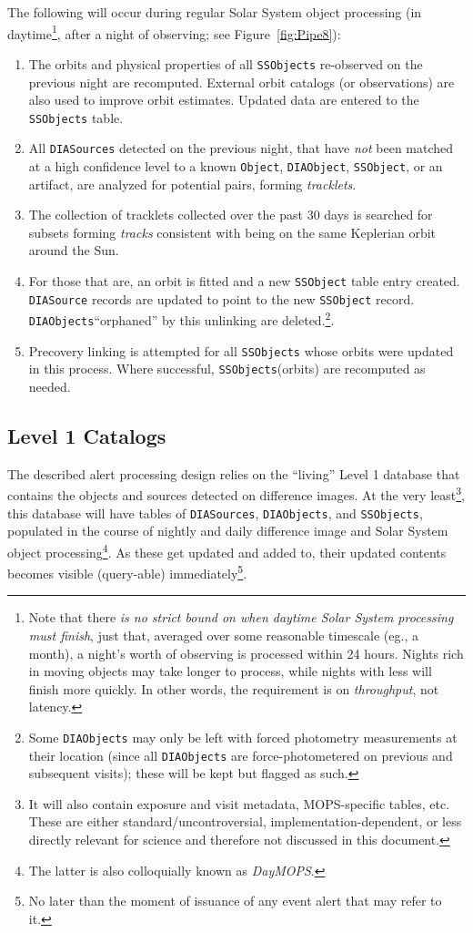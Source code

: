 \documentclass[12pt]{article}
\newcommand{\code}[1]{\texttt{#1}}
\newcommand{\DIASource}{\code{DIASource}\xspace}
\newcommand{\DIASources}{\code{DIASources}\xspace}
\newcommand{\DIAObject}{\code{DIAObject}\xspace}
\newcommand{\DIAObjects}{\code{DIAObjects}\xspace}
\newcommand{\DB}{{Level 1 database}\xspace}
\newcommand{\Object}{\code{Object}\xspace}
\newcommand{\SSObject}{\code{SSObject}\xspace}
\newcommand{\SSObjects}{\code{SSObjects}\xspace}
\begin{document}
The following will occur during regular Solar System object processing (in daytime\footnote{Note that there {\em is no strict bound on when daytime Solar System processing must finish}, just that, averaged over some reasonable timescale (eg., a month), a night's worth of observing is processed within 24 hours. Nights rich in moving objects may take longer to process, while nights with less will finish more quickly. In other words, the requirement is on {\em throughput}, not latency.}, after a night of observing; see Figure~\ref{fig:Pipe8}):
\begin{enumerate}
\item The orbits and physical properties of all \SSObjects re-observed on the previous night are recomputed. External orbit catalogs (or observations) are also used to improve orbit estimates. Updated data are entered to the \SSObjects table.
\item All \DIASources detected on the previous night, that have {\em not} been matched at a high confidence level to a known \Object,
\DIAObject, \SSObject, or an artifact, are analyzed for potential pairs, forming {\em tracklets}.
\item The collection of tracklets collected over the past 30 days is searched for subsets forming {\em tracks} consistent with being on the same Keplerian orbit around the Sun.
\item For those that are, an orbit is fitted and a new \SSObject table entry created. \DIASource records are updated to point to the new \SSObject record. \DIAObjects ``orphaned'' by this unlinking are deleted.\footnote{Some \DIAObjects may only be left with forced photometry measurements at their location (since all \DIAObjects are force-photometered on previous and subsequent visits);  these will be kept but flagged as such.}.
\item Precovery linking is attempted for all \SSObjects whose orbits were updated in this process. Where successful, \SSObjects (orbits) are recomputed as needed.
\end{enumerate}

\subsection{Level 1 Catalogs}
\label{sec:level1db}

The described alert processing design relies on the ``living'' \DB that contains the objects and sources detected on difference images. At the very least\footnote{It will also contain exposure and visit metadata, MOPS-specific tables, etc. These are either standard/uncontroversial, implementation-dependent, or less directly relevant for science and therefore not discussed in this document.}, this database will have tables of \DIASources, \DIAObjects, and \SSObjects, populated in the course of nightly and daily difference image and Solar System object processing\footnote{The latter is also colloquially known as {\em DayMOPS}.}. As these get updated and added to, their updated contents becomes visible (query-able) immediately\footnote{No later than the moment of issuance of any event alert that may refer to it.}.
\\
\end{document}
